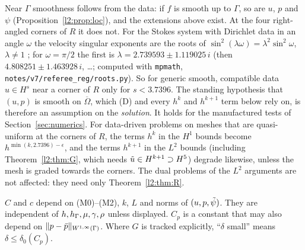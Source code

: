 \begin{remark}\label{rem:corners}
Near $\Gamma$ smoothness follows from the data: if $f$ is smooth up to $\Gamma$, so are $u$, $p$ and $\psi$ (Proposition~\ref{l2:prop:loc}), and the extensions above exist. At the four right-angled corners of $R$ it does not. For the Stokes system with Dirichlet data in an angle $\omega$ the velocity singular exponents are the roots of $\sin^2(\lambda\omega)=\lambda^2\sin^2\omega$, $\lambda\ne1$ \cite{Dauge1989}; for $\omega=\pi/2$ the first is $\lambda=2.739593\pm1.119025\,i$ (then $4.808251\pm1.463928\,i$, \dots; computed with \texttt{mpmath}, \texttt{notes/v7/referee\_reg/roots.py}). So for generic smooth, compatible data $u\in H^s$ near a corner of $R$ only for $s<3.7396$. The standing hypothesis that $(u,p)$ is smooth on $\overline\Omega$, which (D) and every $h^k$ and $h^{k+1}$ term below rely on, is therefore an assumption on the \emph{solution}. It holds for the manufactured tests of Section~\ref{sec:numerics}. For data-driven problems on meshes that are quasi-uniform at the corners of $R$, the terms $h^k$ in the $H^1$ bounds become $h^{\min(k,2.7396)-\epsilon}$, and the terms $h^{k+1}$ in the $L^2$ bounds (including Theorem~\ref{l2:thm:G}, which needs $\tilde u\in H^{k+1}\supset H^5$) degrade likewise, unless the mesh is graded towards the corners. The dual problems of the $L^2$ arguments are not affected: they need only Theorem~\ref{l2:thm:R}.
\end{remark}

$C$ and $c$ depend on (M0)--(M2), $k$, $L$ and norms of $(u,p,\tilde\psi)$. They are independent of $h,h_\Gamma,\mu,\gamma,\rho$ unless displayed. $C_p$ is a constant that may also depend on $\lVert p-\bar p\rVert_{W^{1,\infty}(\Gamma)}$. Where $G$ is tracked explicitly, ``$\delta$ small'' means $\delta\le\delta_0(C_p)$.
